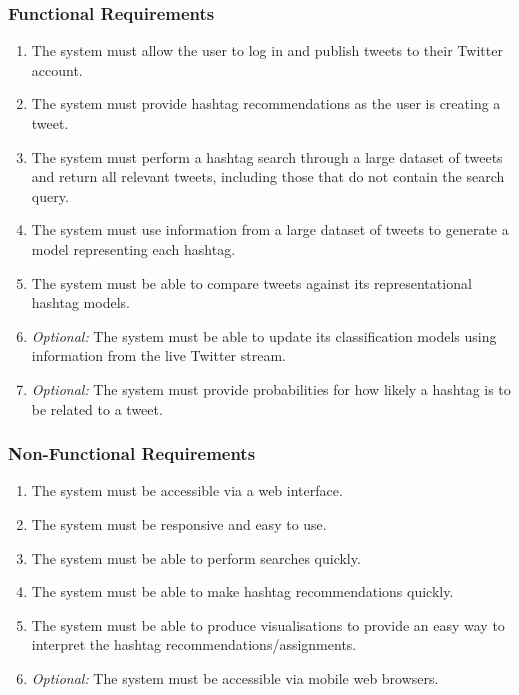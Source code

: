 \documentclass[12pt,a4paper]{article}
\begin{document}
\subsubsection{Functional Requirements}
\begin{enumerate}
    \item \label{func:publish} The system must allow the user to log in and publish tweets to their Twitter account.
    \item \label{func:suggest} The system must provide hashtag recommendations as the user is creating a tweet.
    \item \label{func:search} The system must perform a hashtag search through a large dataset of tweets and return all relevant tweets, including those that do not contain the search query.
    \item \label{func:genmodel} The system must use information from a large dataset of tweets to generate a model representing each hashtag.
    \item \label{func:compmodels} The system must be able to compare tweets against its representational hashtag models.
    \item \label{func:stream} \emph{Optional:} The system must be able to update its classification models using information from the live Twitter stream.
    \item \label{func:probabilities} \emph{Optional:} The system must provide probabilities for how likely a hashtag is to be related to a tweet.
\end{enumerate}

\subsubsection{Non-Functional Requirements}
\begin{enumerate}
    \item \label{nfunc:web} The system must be accessible via a web interface.
    \item \label{nfunc:easy} The system must be responsive and easy to use.
    \item \label{nfunc:qsearch} The system must be able to perform searches quickly.
    \item \label{nfunc:qsuggest} The system must be able to make hashtag recommendations quickly.
    \item \label{nfunc:graphs} The system must be able to produce visualisations to provide an easy way to interpret the hashtag recommendations/assignments.
    \item \label{nfunc:mobile} \emph{Optional:} The system must be accessible via mobile web browsers.
\end{enumerate}
\end{document}
